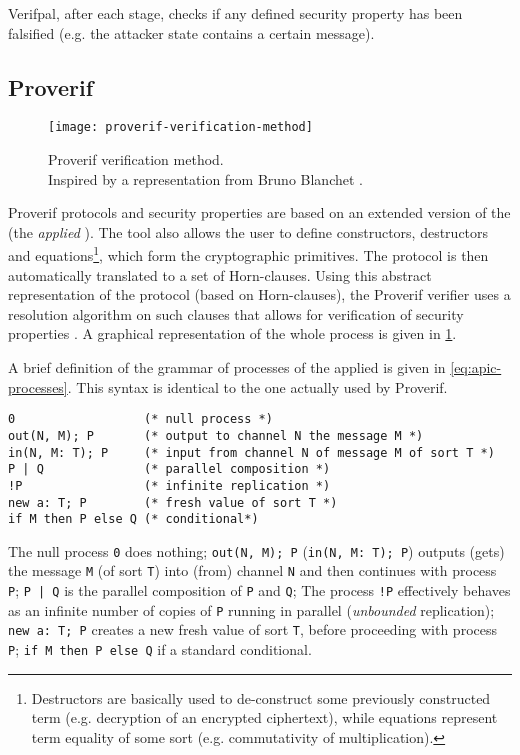 Verifpal, after each stage, checks if any defined security property has been falsified (e.g. the attacker state contains a certain message).

\subsection{Proverif}


\begin{figure}[t]
    \texttt{[image: proverif-verification-method]}
    \centering
    \caption{Proverif verification method.\\Inspired by a representation from Bruno Blanchet \cite{SymbolicComputationalBlanchet}.}
    \label{fig:proverif-verification-method}
\end{figure}

Proverif protocols and security properties are based on an extended version of the \pic (the \textit{applied} \picnospace). The tool also allows the user to define constructors, destructors and equations\footnote{Destructors are basically used to de-construct some previously constructed term (e.g. decryption of an encrypted ciphertext), while equations represent term equality of some sort (e.g. commutativity of multiplication).}, which form the cryptographic primitives. The protocol is then automatically translated to a set of Horn-clauses. Using this abstract representation of the protocol (based on Horn-clauses), the Proverif verifier uses a resolution algorithm on such clauses that allows for verification of security properties \cite{SymbolicComputationalBlanchet}.
A graphical representation of the whole process is given in \cref{fig:proverif-verification-method}.

A brief definition of the grammar of processes of the applied \pic is given in \cref{eq:apic-processes}. This syntax is identical to the one actually used by Proverif.

\lstset{language=proverif}
\begin{lstlisting}
0                  (* null process *)
out(N, M); P       (* output to channel N the message M *)
in(N, M: T); P     (* input from channel N of message M of sort T *)
P | Q              (* parallel composition *)
!P                 (* infinite replication *)
new a: T; P        (* fresh value of sort T *)
if M then P else Q (* conditional*)
\end{lstlisting}

\lstset{language=proverif}
The null process \lstinline{0} does nothing;
\lstinline{out(N, M); P} (\lstinline{in(N, M: T); P}) outputs (gets) the message \lstinline{M} (of sort \lstinline{T}) into (from) channel \lstinline{N} and then continues with process \lstinline{P};
\lstinline{P | Q} is the parallel composition of \lstinline{P} and \lstinline{Q};
The process \lstinline{!P} effectively behaves as an infinite number of copies of \lstinline{P} running in parallel (\textit{unbounded} replication);
\lstinline{new a: T; P} creates a new fresh value of sort \lstinline{T}, before proceeding with process \lstinline{P};
\lstinline{if M then P else Q} if a standard conditional.

